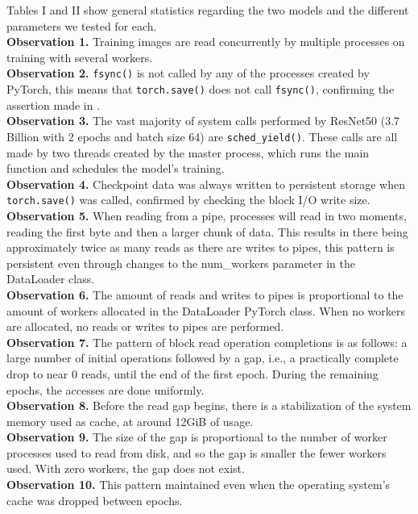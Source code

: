 \documentclass[conference]{IEEEtran}
\begin{document}
Tables I and II show general statistics regarding the two models and the different parameters we tested for each.
\\
\textbf{Observation 1.} Training images are read concurrently by multiple processes on training with several workers.
\\
\textbf{Observation 2.} \texttt{fsync()} is not called by any of the processes created by PyTorch, this means that \texttt{torch.save()} does not call \texttt{fsync()}, confirming the assertion made in \cite{checkfreq}.
\\
\textbf{Observation 3.} The vast majority of system calls performed by ResNet50 (3.7 Billion with 2 epochs and batch size 64) are \texttt{sched\_yield()}. These calls are all made by two threads created by the master process, which runs the main function and schedules the model's training.
\\
\textbf{Observation 4.} Checkpoint data was always written to persistent storage when \texttt{torch.save()} was called, confirmed by checking the block I/O write size.
\\
\textbf{Observation 5.} When reading from a pipe, processes will read in two moments, reading the first byte and then a larger chunk of data. This results in there being approximately twice as many reads as there are writes to pipes, this pattern is persistent even through changes to the num\_workers parameter in the DataLoader class.
\\
\textbf{Observation 6.} The amount of reads and writes to pipes is proportional to the amount of workers allocated in the DataLoader PyTorch class. When no workers are allocated, no reads or writes to pipes are performed.
\\
\textbf{Observation 7.} The pattern of block read operation completions is as follows: a large number of initial operations followed by a gap, i.e., a practically complete drop to near 0 reads, until the end of the first epoch. During the remaining epochs, the accesses are done uniformly.
\\
\textbf{Observation 8.} Before the read gap begins, there is a stabilization of the system memory used as cache, at around 12GiB of usage.
\\
\textbf{Observation 9.} The size of the gap is proportional to the number of worker processes used to read from disk, and so the gap is smaller the fewer workers used. With zero workers, the gap does not exist.
\\
\textbf{Observation 10.} This pattern maintained even when the operating system's cache was dropped between epochs.
\end{document}
